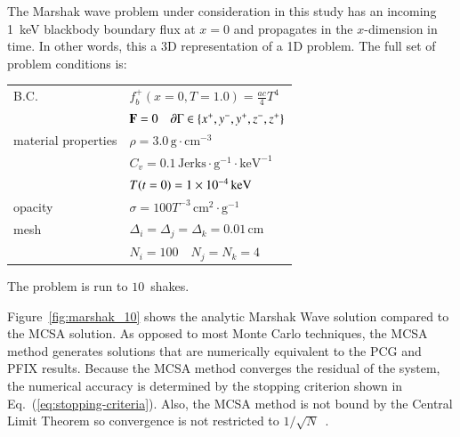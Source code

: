 \documentclass[preprint,12pt]{elsarticle}
\newcommand{\Cv}{\ensuremath{C_{v}}}
\newcommand{\Di}{\ensuremath{\Delta_i}}
\newcommand{\Dj}{\ensuremath{\Delta_j}}
\newcommand{\Dk}{\ensuremath{\Delta_k}}
\begin{document}
The Marshak wave problem under consideration in this study has an
incoming 1~keV blackbody boundary flux at $x=0$ and propagates
in the $x$-dimension in time.  In other words, this a 3D
representation of a 1D problem.  The full set of problem conditions
is:
\begin{center}
  \begin{tabular}{ll}\hline
    B.C. & $f_b^{+}(x=0,T=1.0) = \frac{ac}{4}T^4$ \\
    & $\mathbf{F} = 0\quad \partial\Gamma \in \{x^{+}, y^{-}, y^{+},
    z^{-}, z^{+}\}$ \\
    material properties & $\rho = 3.0\,\text{g}\cdot\text{cm}^{-3}$ \\
    & $\Cv = 0.1\,\text{Jerks}\cdot\text{g}^{-1}\cdot\text{keV}^{-1}$\\
    & $T(t=0) = 1\times 10^{-4}\,\text{keV}$\\
    opacity & $\sigma = 100T^{-3}\,\text{cm}^2\cdot\text{g}^{-1}$ \\
    mesh & $\Di = \Dj = \Dk = 0.01\,\text{cm}$ \\
    & $N_i = 100\quad N_j = N_k = 4$ \\
    \hline
  \end{tabular}
\end{center}
The problem is run to $10$~shakes.

Figure~\ref{fig:marshak_10} shows the analytic Marshak Wave solution
compared to the MCSA solution.  As opposed to most Monte Carlo
techniques, the MCSA method generates solutions that are numerically
equivalent to the PCG and PFIX results.  Because the MCSA method
converges the residual of the system, the numerical accuracy is
determined by the stopping criterion shown in
Eq.~(\ref{eq:stopping-criteria}).  Also, the MCSA method is not bound
by the Central Limit Theorem so convergence is not restricted to
$1/\sqrt{N}$~\cite{halton_1994,evans_2003}.
\end{document}
